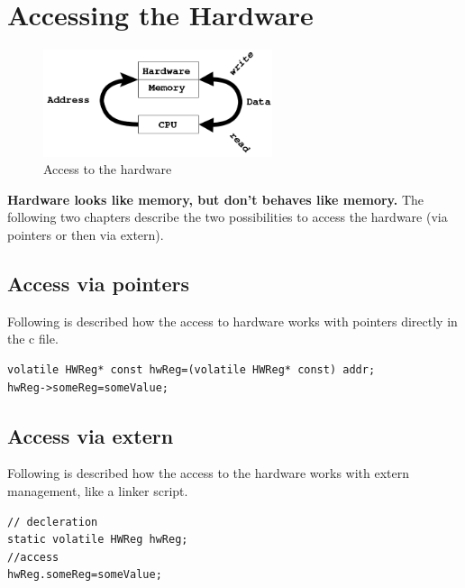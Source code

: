 \section{Accessing the Hardware}


\begin{figure}[H]
\centering
\includegraphics[width=0.6\textwidth]{figures/accessingHardware.png}
\caption{Access to the hardware}
\end{figure}

\textbf{Hardware looks like memory, but don't behaves like memory.}
The following two chapters describe the two possibilities to access the hardware (via pointers or then via extern).

\hypertarget{access-via-pointers}{%
\subsection{Access via pointers}\label{access-via-pointers}}

Following is described how the access to hardware works with pointers directly in the c file.

\begin{lstlisting}
volatile HWReg* const hwReg=(volatile HWReg* const) addr;
hwReg->someReg=someValue;
\end{lstlisting}

\hypertarget{access-via-extern}{%
\subsection{Access via extern}\label{access-via-extern}}

Following is described how the access to the hardware works with extern
management, like a linker script.

\begin{lstlisting}
// decleration
static volatile HWReg hwReg;
//access
hwReg.someReg=someValue;
\end{lstlisting}

\clearpage